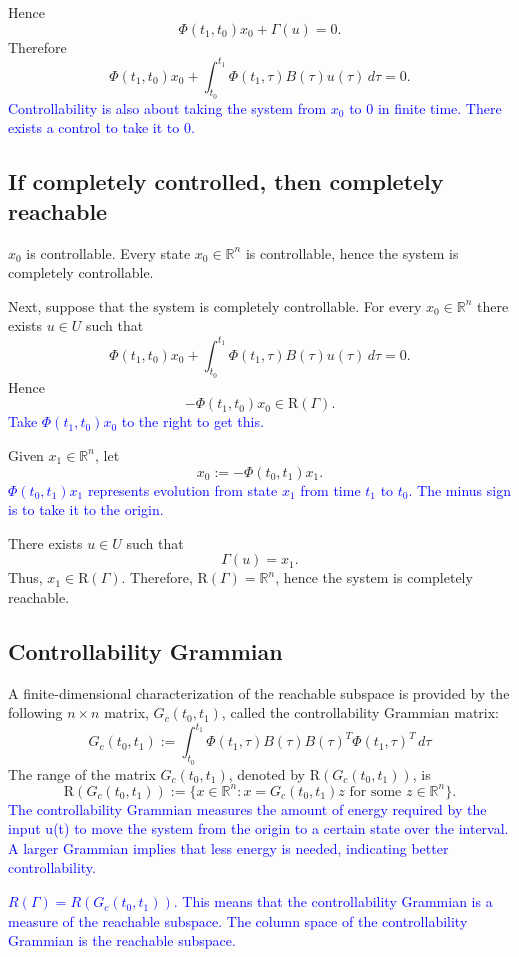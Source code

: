 \documentclass{article}
\begin{document}
Hence
\[
\Phi(t_1, t_0)x_0 + \Gamma(u) = 0.
\]
Therefore
\[
\Phi(t_1, t_0)x_0 + \int_{t_0}^{t_1} \Phi(t_1, \tau) B(\tau) u(\tau) \, d\tau = 0.
\]
\textcolor{blue}{Controllability is also about taking the system from $x_0$ to $0$ in finite time. There exists a control to take it to 0.}

\subsection{If completely controlled, then completely reachable}  
$x_0$ is controllable. Every state $x_0 \in \mathbb{R}^n$ is controllable, hence the system is completely controllable.

Next, suppose that the system is completely controllable. For every $x_0 \in \mathbb{R}^n$ there exists $u \in U$ such that
\[
\Phi(t_1, t_0)x_0 + \int_{t_0}^{t_1} \Phi(t_1, \tau) B(\tau) u(\tau) \, d\tau = 0.
\]
Hence
\[
-\Phi(t_1, t_0)x_0 \in \text{R}(\Gamma).
\]
\textcolor{blue}{Take $\Phi(t_1,t_0)x_0$ to the right to get this.}

Given $x_1 \in \mathbb{R}^n$, let
\[
x_0 := -\Phi(t_0, t_1)x_1.
\]
\textcolor{blue}{$\Phi(t_0,t_1)x_1$ represents evolution from state $x_1$ from time $t_1$ to $t_0$. The minus sign is to take it to the origin.}

There exists $u \in U$ such that
\[
\Gamma(u) = x_1.
\]
Thus, $x_1 \in \text{R}(\Gamma)$. Therefore, $\text{R}(\Gamma) = \mathbb{R}^n$, hence the system is completely reachable.

\subsection{Controllability Grammian}
A finite-dimensional characterization of the reachable subspace is provided by the following $n \times n$ matrix, $G_c(t_0, t_1)$, called the controllability Grammian matrix:
\[
G_c(t_0, t_1) := \int_{t_0}^{t_1} \Phi(t_1, \tau) B(\tau) B(\tau)^T \Phi(t_1, \tau)^T \, d\tau
\]
The range of the matrix $G_c(t_0, t_1)$, denoted by $\text{R}(G_c(t_0, t_1))$, is
\[
\text{R}(G_c(t_0, t_1)) := \{ x \in \mathbb{R}^n : x = G_c(t_0, t_1) z \text{ for some } z \in \mathbb{R}^n \}.
\]
\textcolor{blue}{The controllability Grammian measures the amount of energy required by the input u(t) to move the system from the origin to a certain state over the interval. A larger Grammian implies that less energy is needed, indicating better controllability.}

\textcolor{blue}{$R(\Gamma)=R(G_c(t_0,t_1))$. This means that the controllability Grammian is a measure of the reachable subspace. The column space of the controllability Grammian is the reachable subspace. }    
 
\end{document}
